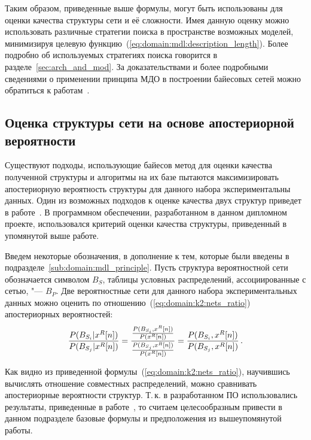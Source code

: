 Таким образом, приведенные выше формулы, могут быть использованы для оценки качества структуры сети и её сложности.
Имея данную оценку можно использовать различные стратегии поиска в пространстве возможных моделей, минимизируя целевую функцию~(\ref{eq:domain:mdl:description_length}).
Более подробно об используемых стратегиях поиска говорится в разделе~\ref{sec:arch_and_mod}.
За доказательствами и более подробными сведениями о применении принципа МДО в построении байесовых сетей можно обратиться к работам~\cite{Lam94learningbayesian,Suzuki93,terentyev_2006,Grunwald05atutorial}.



\subsection{Оценка структуры сети на основе апостериорной вероятности}
\label{sub:domain:k2_algo}
Существуют подходы, использующие байесов метод для оценки качества полученной структуры и алгоритмы на их базе пытаются максимизировать апостериорную вероятность структуры для данного набора экспериментальны данных.
Один из возможных подходов к оценке качества двух структур приведет в работе~\cite{Cooper1991}.
В программном обеспечении, разработанном в данном дипломном проекте, использовался критерий оценки качества структуры, приведенный в упомянутой выше работе.

Введем некоторые обозначения, в дополнение к тем, которые были введены в подразделе~\ref{sub:domain:mdl_principle}.
Пусть структура вероятностной сети обозначается символом $B_S$, таблицы условных распределений, ассоциированные с сетью, "--- $B_P$.
Две вероятностные сети для данного набора экспериментальных данных можно оценить по отношению~(\ref{eq:domain:k2:nets_ratio}) апостериорных вероятностей:
\begin{equation}
  \label{eq:domain:k2:nets_ratio}
  \frac{P(B_{S_i} | x^R[n])}{P(B_{S_j} | x^R[n])} =
    \frac{ \frac{P(B_{S_i}, x^R[n])}{P(x^R[n])} }
         { \frac{P(B_{S_j}, x^R[n])}{P(x^R[n])} } =
    \frac{ P(B_{S_i}, x^R[n]) }
         { P(B_{S_j}, x^R[n]) } \text{\,.}
\end{equation}

Как видно из приведенной формулы~(\ref{eq:domain:k2:nets_ratio}), научившись вычислять отношение совместных распределений, можно сравнивать апостериорные вероятности структур.
Т.\,к. в разработанном ПО использовались результаты, приведенные в работе~\cite{Cooper1991}, то считаем целесообразным привести в данном подразделе базовые формулы и предположения из вышеупомянутой работы.

